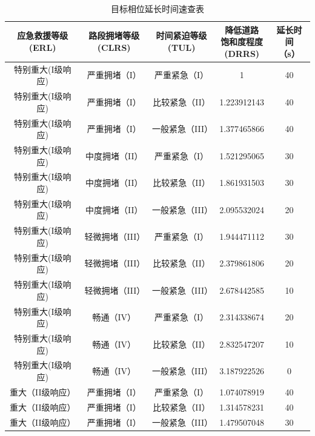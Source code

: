 \begin{center}
	\begin{longtable}{|c|c|c|c|c|}
		\caption{目标相位延长时间速查表} 
		\label{table:fulu_extendtime} \\
		\hline
		\tabincell{c}{应急救援等级\\(ERL)} & \tabincell{c}{路段拥堵等级\\(CLRS)}	& \tabincell{c}{时间紧迫等级\\(TUL)} & \tabincell{c}{降低道路\\饱和度程度\\(DRRS)} & \tabincell{c}{延长时间\\（s） }\\ \hline
		特别重大(I级响应) & 严重拥堵（I）   &    严重紧急（I）      &      1			 & 40  \\  \hline
		特别重大(I级响应) & 严重拥堵（I）   &	 比较紧急（II）	 &  1.223912143	     & 40  \\ \hline
		特别重大(I级响应) & 严重拥堵（I）   &	 一般紧急（III）   &  	1.377465866	 & 40  \\ \hline
		特别重大(I级响应) & 中度拥堵（II）  &	 严重紧急（I）	 &  1.521295065	     & 30  \\ \hline
		特别重大(I级响应) & 中度拥堵（II）  &	 比较紧急（II）    &  	1.861931503	 & 30  \\ \hline
		特别重大(I级响应) & 中度拥堵（II）  &	 一般紧急（III）   &  	2.095532024	 & 20  \\  \hline
		特别重大(I级响应) & 轻微拥堵（III） &	 严重紧急（I）     &  	1.944471112	 & 30  \\  \hline
		特别重大(I级响应) & 轻微拥堵（III） &	 比较紧急（II）    &  	2.379861806	 & 20  \\ \hline
		特别重大(I级响应) & 轻微拥堵（III） &	 一般紧急（III）   &  	2.678442585	 & 10  \\ \hline
		特别重大(I级响应) & 畅通（IV）		 &     严重紧急（I）     &  2.314338674      & 20  \\ \hline
		特别重大(I级响应) & 畅通（IV）		 &     比较紧急（II）    &  	  2.832547207  & 10  \\ \hline
		特别重大(I级响应) & 畅通（IV）		 &    一般紧急（III）    &    3.187922526    & 0   \\ \hline
		重大（II级响应）  &   严重拥堵（I）  &	 严重紧急（I）     &  1.074078919	     & 40  \\ \hline
		重大（II级响应）  &   严重拥堵（I）  &	 比较紧急（II）	 &  1.314578231	     & 40  \\ \hline
		重大（II级响应）  &   严重拥堵（I）  &	 一般紧急（III）   &  	1.479507048	 & 30  \\ \hline

\end{longtable}
\end{center}
